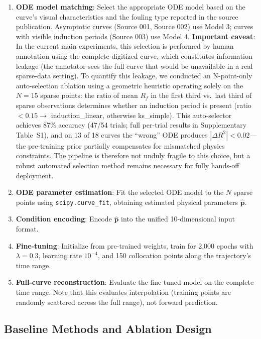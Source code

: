 \documentclass[review]{elsarticle}
\begin{document}
\begin{enumerate}
\item \textbf{ODE model matching}: Select the appropriate ODE model based on the curve's visual characteristics and the fouling type reported in the source publication. Asymptotic curves (Source 001, Source 002) use Model 3; curves with visible induction periods (Source 003) use Model 4. \textbf{Important caveat}: In the current main experiments, this selection is performed by human annotation using the complete digitized curve, which constitutes information leakage (the annotator sees the full curve that would be unavailable in a real sparse-data setting). To quantify this leakage, we conducted an N-point-only auto-selection ablation using a geometric heuristic operating solely on the $N=15$ sparse points: the ratio of mean $R_f$ in the first third vs.\ last third of sparse observations determines whether an induction period is present (ratio $<0.15 \to$ induction\_linear, otherwise ks\_simple). This auto-selector achieves 87\% accuracy (47/54 trials; full per-trial results in Supplementary Table~S1), and on 13 of 18 curves the ``wrong'' ODE produces $|\Delta R^2| < 0.02$---the pre-training prior partially compensates for mismatched physics constraints. The pipeline is therefore not unduly fragile to this choice, but a robust automated selection method remains necessary for fully hands-off deployment.
\item \textbf{ODE parameter estimation}: Fit the selected ODE model to the $N$ sparse points using \texttt{scipy.curve\_fit}, obtaining estimated physical parameters $\hat{\mathbf{p}}$.
\item \textbf{Condition encoding}: Encode $\hat{\mathbf{p}}$ into the unified 10-dimensional input format.
\item \textbf{Fine-tuning}: Initialize from pre-trained weights, train for 2,000 epochs with $\lambda = 0.3$, learning rate $10^{-4}$, and 150 collocation points along the trajectory's time range.
\item \textbf{Full-curve reconstruction}: Evaluate the fine-tuned model on the complete time range. Note that this evaluates interpolation (training points are randomly scattered across the full range), not forward prediction.
\end{enumerate}

\subsection{Baseline Methods and Ablation Design}
\end{document}
